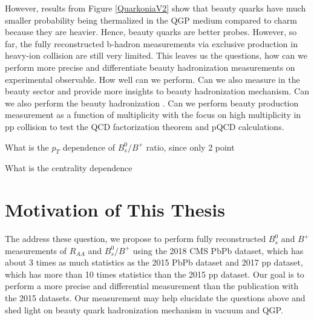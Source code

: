 However, results from Figure \ref{QuarkoniaV2} show that beauty quarks have much smaller probability being thermalized in the QGP medium compared to charm because they are heavier. Hence, beauty quarks are better probes. However, so far, the fully reconstructed b-hadron measurements via exclusive production in heavy-ion collision are still very limited. This leaves us the questions, how can we perform more precise and differentiate beauty hadronization measurements on experimental observable. How well can we perform. Can we also measure in the beauty sector and provide more insights to beauty hadronization mechanism. Can we also perform the beauty hadronization . Can we perform beauty production measurement as a function of multiplicity with the focus on high multiplicity  in pp collision to test the QCD factorization theorem and pQCD calculations. 



What is the $p_T$ dependence of $B^0_s/B^+$ ratio, since only 2 point

What is the centrality dependence



\section{Motivation of This Thesis}

The address these question, we propose to perform fully reconstructed $B^0_s$ and $B^+$ measurements of $R_{AA}$ and $B^0_s/B^+$ using the 2018 CMS PbPb dataset, which has about 3 times as much statistics as the 2015 PbPb dataset and 2017 pp dataset, which has more than 10 times statistics than the 2015 pp dataset. Our goal is to perform a more precise and differential measurement than the publication with the 2015 datasets. Our measurement may help elucidate the questions above and shed light on beauty quark hadronization mechanism in vacuum and QGP. 


